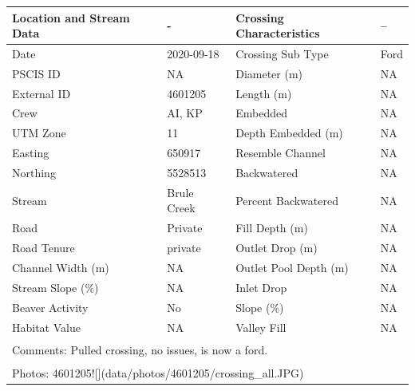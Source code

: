 \documentclass[
]{book}
\begin{document}
\begin{tabular}{llll}
\toprule
Location and Stream Data & - & Crossing Characteristics & --\\
\midrule
Date & 2020-09-18 & Crossing Sub Type & Ford\\
PSCIS ID & NA & Diameter (m) & NA\\
External ID & 4601205 & Length (m) & NA\\
Crew & AI, KP & Embedded & NA\\
UTM Zone & 11 & Depth Embedded (m) & NA\\
\addlinespace
Easting & 650917 & Resemble Channel & NA\\
Northing & 5528513 & Backwatered & NA\\
Stream & Brule Creek & Percent Backwatered & NA\\
Road & Private & Fill Depth (m) & NA\\
Road Tenure & private & Outlet Drop (m) & NA\\
\addlinespace
Channel Width (m) & NA & Outlet Pool Depth (m) & NA\\
Stream Slope (\%) & NA & Inlet Drop & NA\\
Beaver Activity & No & Slope (\%) & NA\\
Habitat Value & NA & Valley Fill & NA\\
\bottomrule
\multicolumn{4}{l}{\textsuperscript{} Comments: Pulled crossing, no issues, is now a ford.}\\
\multicolumn{4}{l}{\textsuperscript{} Photos: 4601205![](data/photos/4601205/crossing\_all.JPG)}\\
\end{tabular}
\end{document}
